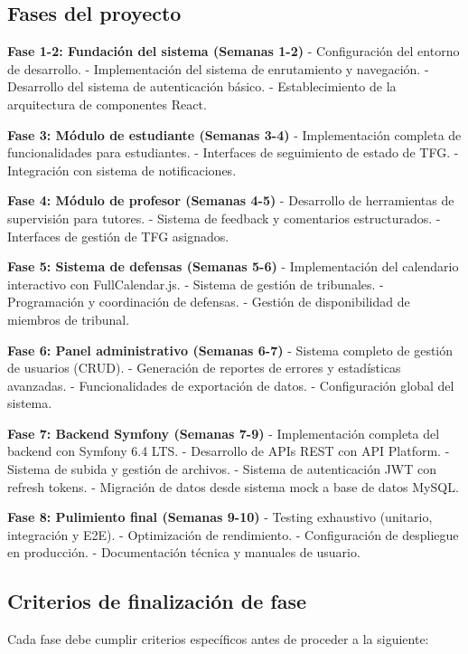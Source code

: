 \documentclass[12pt,a4paper,oneside]{report}
\begin{document}
\subsection{Fases del proyecto}\label{fases-del-proyecto}

\textbf{Fase 1-2: Fundación del sistema (Semanas 1-2)} - Configuración
del entorno de desarrollo. - Implementación del sistema de enrutamiento y
navegación. - Desarrollo del sistema de autenticación básico. -
Establecimiento de la arquitectura de componentes React.

\textbf{Fase 3: Módulo de estudiante (Semanas 3-4)} - Implementación
completa de funcionalidades para estudiantes. - Interfaces de seguimiento de estado de TFG. -
Integración con sistema de notificaciones.

\textbf{Fase 4: Módulo de profesor (Semanas 4-5)} - Desarrollo de
herramientas de supervisión para tutores. - Sistema de feedback y
comentarios estructurados. - Interfaces de gestión de TFG asignados.

\textbf{Fase 5: Sistema de defensas (Semanas 5-6)} - Implementación del
calendario interactivo con FullCalendar.js. - Sistema de gestión de
tribunales. - Programación y coordinación de defensas. - Gestión de
disponibilidad de miembros de tribunal.

\textbf{Fase 6: Panel administrativo (Semanas 6-7)} - Sistema completo
de gestión de usuarios (CRUD). - Generación de reportes de errores y estadísticas
avanzadas. - Funcionalidades de exportación de datos. - Configuración
global del sistema.

\textbf{Fase 7: Backend Symfony (Semanas 7-9)} - Implementación completa
del backend con Symfony 6.4 LTS. - Desarrollo de APIs REST con API
Platform. - Sistema de subida y gestión de archivos. - Sistema de autenticación JWT con refresh tokens. - Migración
de datos desde sistema mock a base de datos MySQL.

\textbf{Fase 8: Pulimiento final (Semanas 9-10)} - Testing exhaustivo
(unitario, integración y E2E). - Optimización de rendimiento. -
Configuración de despliegue en producción. - Documentación técnica y
manuales de usuario.

\subsection{Criterios de finalización de
fase}\label{criterios-de-finalizaciuxf3n-de-fase}

Cada fase debe cumplir criterios específicos antes de proceder a la
siguiente:
\end{document}
